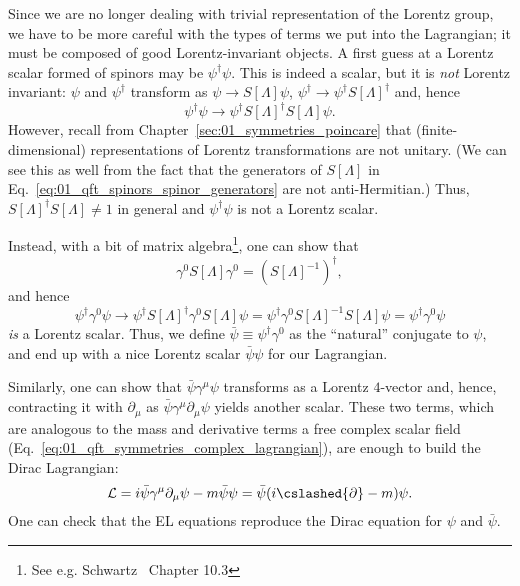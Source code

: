 Since we are no longer dealing with trivial representation of the Lorentz group, we have to be more careful with the types of terms we put into the Lagrangian; it must be composed of good Lorentz-invariant objects.
A first guess at a Lorentz scalar formed of spinors may be $\psi^\dagger\psi$.
This is indeed a scalar, but it is \textit{not} Lorentz invariant:
$\psi$ and $\psi^\dagger$ transform as $\psi\rightarrow S[\Lambda]\psi$, $\psi^\dagger\rightarrow \psi^\dagger S[\Lambda]^\dagger$ and, hence
\begin{equation}
	\label{eq:01_qft_spinors_lagrangian_scalar_wrong}
	\psi^\dagger\psi \rightarrow \psi^\dagger S[\Lambda]^\dagger S[\Lambda]\psi. %
\end{equation}
However, recall from Chapter~\ref{sec:01_symmetries_poincare} that (finite-dimensional) representations of Lorentz transformations are not unitary.
(We can see this as well from the fact that the generators of $S[\Lambda]$ in Eq.~\ref{eq:01_qft_spinors_spinor_generators} are not anti-Hermitian.)
Thus, $S[\Lambda]^\dagger S[\Lambda] \neq 1$ in general and $\psi^\dagger\psi$ is not a Lorentz scalar.

Instead, with a bit of matrix algebra\footnote{See e.g. Schwartz~\cite{Schwartz:2014sze} Chapter 10.3}, one can show that
\begin{equation}
	\label{eq:01_qft_spinors_gamma0_inverse}
	\gamma^0 S[\Lambda] \gamma^0 = (S[\Lambda]^{-1})^\dagger,
\end{equation}
and hence
\begin{equation}
	\label{eq:01_qft_spinors_lagrangian_scalar}
	\psi^\dagger\gamma^0\psi \rightarrow \psi^\dagger S[\Lambda]^\dagger \gamma^0 S[\Lambda]\psi = \psi^\dagger\gamma^0 S[\Lambda]^{-1} S[\Lambda]\psi = \psi^\dagger\gamma^0\psi
\end{equation}
\textit{is} a Lorentz scalar.
Thus, we define $\bar\psi \equiv \psi^\dagger\gamma^0$ as the ``natural'' conjugate to $\psi$, and end up with a nice Lorentz scalar $\bar\psi \psi$ for our Lagrangian.

Similarly, one can show that $\bar\psi\gamma^\mu\psi$ transforms as a Lorentz $4$-vector and, hence, contracting it with $\partial_\mu$ as $\bar\psi\gamma^\mu\partial_\mu\psi$ yields another scalar.
These two terms, which are analogous to the mass and derivative terms a free complex scalar field (Eq.~\ref{eq:01_qft_symmetries_complex_lagrangian}), are enough to build the Dirac Lagrangian:
\begin{equation}
	\label{eq:01_qft_spinors_lagrangian}
	\mathcal{L} = i\bar\psi\gamma^\mu\partial_\mu\psi - m\bar\psi\psi = \bar\psi(i\cslashed{\partial} - m)\psi.
\end{equation}
One can check that the EL equations reproduce the Dirac equation for $\psi$ and $\bar\psi$.

